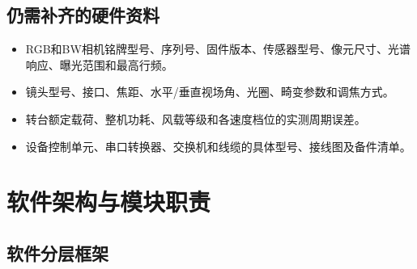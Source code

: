 \documentclass[UTF8,a4paper,11pt,openany]{ctexrep}
\begin{document}
\section{仍需补齐的硬件资料}

\begin{itemize}
  \item RGB和BW相机铭牌型号、序列号、固件版本、传感器型号、像元尺寸、光谱响应、曝光范围和最高行频。
  \item 镜头型号、接口、焦距、水平/垂直视场角、光圈、畸变参数和调焦方式。
  \item 转台额定载荷、整机功耗、风载等级和各速度档位的实测周期误差。
  \item 设备控制单元、串口转换器、交换机和线缆的具体型号、接线图及备件清单。
\end{itemize}

\chapter{软件架构与模块职责}

\section{软件分层框架}
\end{document}
